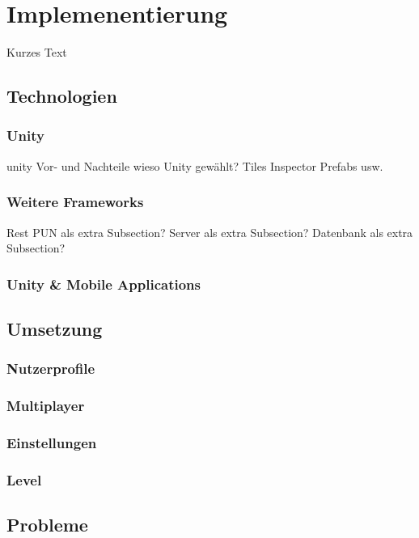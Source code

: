 \chapter{Implemenentierung}
\label{cha:implementierung}
Kurzes Text

\section{Technologien}
\label{sec:grundlagen:technologien}

\subsection{Unity}
\label{subsec:grundlagen:technologien:unity}
unity
Vor- und Nachteile
wieso Unity gewählt?
Tiles 
Inspector
Prefabs
usw.

\subsection{Weitere Frameworks}
\label{subsec:implementierung:technologien:frameworks}
Rest
PUN als extra Subsection?
Server als extra Subsection?
Datenbank als extra Subsection?

\subsection{Unity \& Mobile Applications}
\label{subsec:implementierung:technologien:mobile}

\section{Umsetzung}
\label{sec:grundlagen:umsetzung}

\subsection{Nutzerprofile}
\label{subsec:implementierung:umsetzung:nutzerprofile}

\subsection{Multiplayer}
\label{subsec:implementierung:umsetzung:multiplayer}

\subsection{Einstellungen}
\label{subsec:implementierung:umsetzung:einstellungen}

\subsection{Level}
\label{subsec:implementierung:umsetzung:level}

\section{Probleme}
\label{sec:implementierung:probleme}
